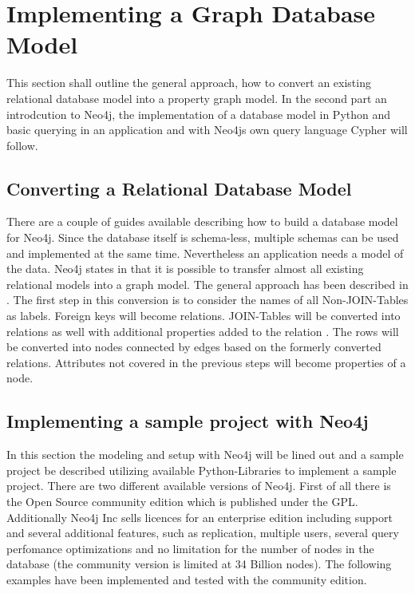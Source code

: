 \section{Implementing a Graph Database Model}
This section shall outline the general approach, how to convert an existing relational database model into a property graph model.
In the second part an introdcution to Neo4j, the implementation of a database model in Python and basic querying in an application and with Neo4js own query language \glqq Cypher\grqq{} will follow.

\subsection{Converting a Relational Database Model}
There are a couple of guides available describing how to build a database model for Neo4j. Since the database itself is schema-less, multiple schemas can be used and implemented at the same time.
Nevertheless an application needs a model of the data.
Neo4j states in \autocite{neo4j:rel_to_graph} that it is possible to transfer almost all existing relational models into a graph model.
The general approach has been described in \autocite{dzone:rel_to_graph}.
The first step in this conversion is to consider the names of all Non-JOIN-Tables as labels.
Foreign keys will become relations.
JOIN-Tables will be converted into relations as well with additional properties added to the relation \autocite{neo4j:graph_vs_rdbms}.
The rows will be converted into nodes connected by edges based on the formerly converted relations. Attributes not covered in the previous steps will become properties of a node.

\subsection{Implementing a sample project with Neo4j}
In this section the modeling and setup with Neo4j will be lined out and a sample project be described utilizing available Python-Libraries to implement a sample project.
There are two different available versions of Neo4j.
First of all there is the Open Source community edition which is published under the GPL.
Additionally Neo4j Inc sells licences for an enterprise edition \autocite{neo4j:editions} including support and several additional features, such as replication, multiple users, several query perfomance optimizations and no limitation for the number of nodes in the database (the community version is limited at 34 Billion nodes).
The following examples have been implemented and tested with the community edition.

